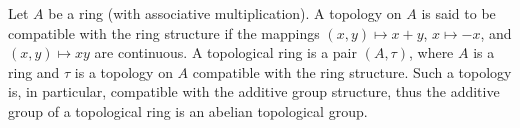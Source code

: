 Let $A$ be a ring (with associative multiplication). A topology on $A$ is said to be compatible with the ring structure if the mappings $(x, y) \mapsto x + y$, $x \mapsto -x$, and $(x, y) \mapsto xy$ are continuous. A topological ring is a pair $(A, \tau)$, where $A$ is a ring and $\tau$ is a topology on $A$ compatible with the ring structure. Such a topology is, in particular, compatible with the additive group structure, thus the additive group of a topological ring is an abelian topological group.
